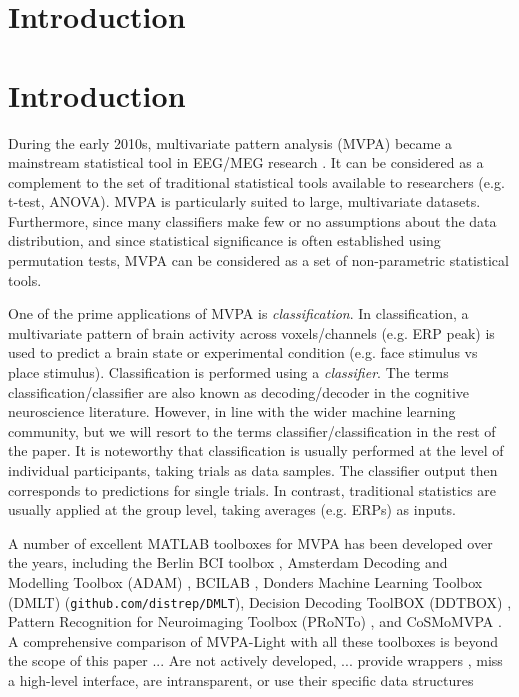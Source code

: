 \documentclass[utf8]{frontiersSCNS} %
\newcommand{\mvpa}{MVPA-Light}
\begin{document}
\section{Introduction}


\section{Introduction}

During the early 2010s, multivariate pattern analysis (MVPA) became a mainstream statistical tool in EEG/MEG research \citep{Lemm2011,Grootswagers2017DecodingData}. It can be considered as a complement to the set of traditional statistical tools available to researchers (e.g. t-test, ANOVA). MVPA is particularly suited to large, multivariate datasets. Furthermore, since many classifiers make few or no assumptions about the data distribution, and since  statistical significance is often established using permutation tests, MVPA can be considered as a set of non-parametric statistical tools.

One of the prime applications of MVPA is \textit{classification}. In classification, a multivariate pattern of brain activity across voxels/channels (e.g. ERP peak) is used to predict a brain state or experimental condition (e.g. face stimulus vs place stimulus). Classification is performed using a \textit{classifier}. The terms classification/classifier are also known as decoding/decoder in the cognitive neuroscience literature. However, in line with the wider machine learning community, but we will resort to the terms classifier/classification in the rest of the paper. It is noteworthy that classification is usually performed at the level of individual participants, taking trials as data samples. The classifier output then corresponds to predictions for single trials. In contrast, traditional statistics are usually applied at the group level, taking averages (e.g. ERPs) as inputs.

A number of excellent MATLAB toolboxes for MVPA has been developed over the years, including the Berlin BCI toolbox \cite{Blankertz2016TheControl}, Amsterdam Decoding and Modelling Toolbox (ADAM) \citep{Fahrenfort2018FromADAM}, BCILAB \cite{Kothe2013BCILAB:Development}, Donders Machine Learning Toolbox (DMLT) (\texttt{github.com/distrep/DMLT}), Decision Decoding ToolBOX (DDTBOX) \citep{Bode2019ThePotentials}, Pattern Recognition for Neuroimaging Toolbox (PRoNTo) \citep{Schrouff2013PRoNTo:Toolbox}, and CoSMoMVPA \citep{Oosterhof2016CoSMoMVPA:Octave}. A comprehensive comparison of \mvpa{} with all these toolboxes is beyond the scope of this paper  ... 
Are not actively developed, ... provide wrappers , miss a high-level interface, are intransparent, or use their specific data structures 
\end{document}
